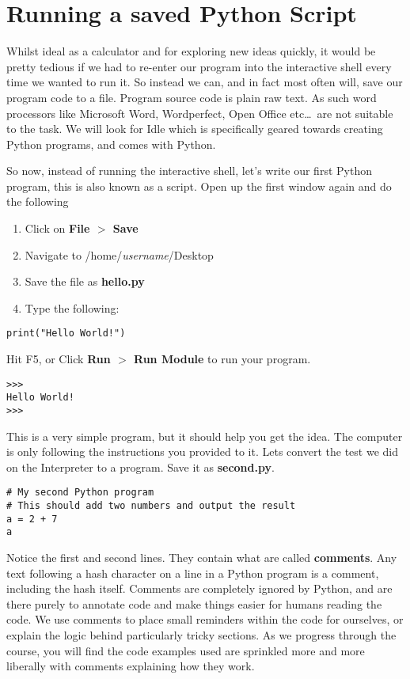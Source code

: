 \section{Running a saved Python Script}

Whilst ideal as a calculator and for exploring new ideas quickly, it   would be pretty tedious if we had to re-enter our program into the   interactive shell every time we wanted to run it. So instead we can,   and in fact most often will, save our program code to a file. Program   source code is plain raw text. As such word processors like Microsoft   Word, Wordperfect, Open Office etc\ldots\ are not suitable to the task. We will   look for Idle which is specifically geared towards creating Python programs,   and comes with   Python. 

So now, instead of running the interactive shell, let's write our   first Python program, this is also known as a script. Open up the first window again and do the following
\begin{enumerate}
    \item Click on \textbf{File $>$ Save}
    \item Navigate to /home/\textit{username}/Desktop
    \item Save the file as \textbf{hello.py}
    \item Type the following:
\end{enumerate}
\begin{lstlisting}
print("Hello World!")
\end{lstlisting}

Hit F5, or Click \textbf{Run $>$ Run Module} to    run your program.


\begin{lstlisting}
>>>
Hello World!
>>>
\end{lstlisting}

This is a very simple program, but it should help you get the    idea. The computer is only following the instructions you provided   to it. Lets convert the test we did on the Interpreter to a program.   Save it as \textbf{second.py}.   
\begin{lstlisting}
# My second Python program
# This should add two numbers and output the result
a = 2 + 7
a
\end{lstlisting}

Notice the first and second lines. They contain what are called   \textbf{comments}. Any text following a hash character on a   line in a Python program is a comment, including the hash itself.   Comments are completely ignored by Python, and are there purely to   annotate code and make things easier for humans reading the code. We   use comments to place small reminders within the code for ourselves, or   explain the logic behind particularly tricky sections. As we   progress through the course, you will find the code examples used are   sprinkled more and more liberally with comments explaining how they   work.


